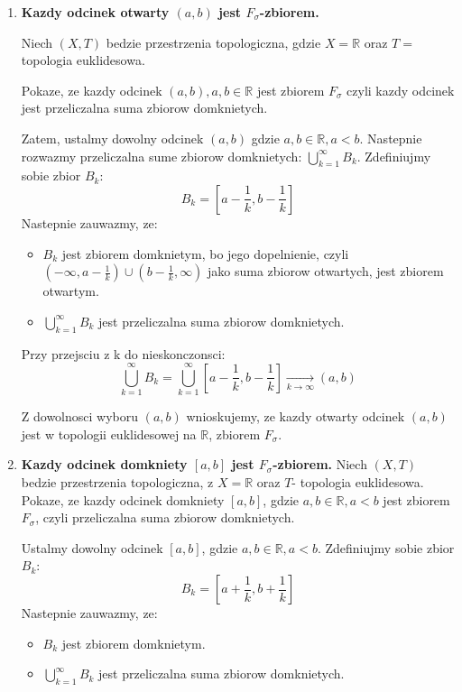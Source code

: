 \documentclass{article}
\begin{document}
\begin{enumerate}[align=left]
\begin{enumerate}[label=(\alph*)]
\begin{enumerate}[label=(\roman*)]
                
               \item \textbf{Kazdy odcinek otwarty $(a,b)$ jest $F_{\sigma}$-zbiorem.}

                    Niech $(X, T)$ bedzie przestrzenia topologiczna, gdzie $X = \mathbb{R}$ oraz $T =$ topologia euklidesowa. 

                    Pokaze, ze kazdy odcinek $(a,b), a,b \in \mathbb{R}$ jest zbiorem $F_{\sigma}$ czyli kazdy odcinek jest przeliczalna suma zbiorow domknietych.

                    Zatem, ustalmy dowolny odcinek $(a, b)$ gdzie $a,b \in \mathbb{R}, a < b$. Nastepnie rozwazmy przeliczalna sume zbiorow domknietych: $\bigcup\limits_{k = 1}^{\infty}B_{k}$. Zdefiniujmy sobie zbior $B_{k}$:
                    $$B_{k} = [a - \frac{1}{k}, b - \frac{1}{k}]$$
             Nastepnie zauwazmy, ze:
                    \begin{itemize}
                        \item $B_{k}$ jest zbiorem domknietym, bo jego dopelnienie, czyli $(-\infty, a - \frac{1}{k}) \cup (b - \frac{1}{k}, \infty)$ jako suma zbiorow otwartych, jest zbiorem otwartym.
                        \item $\bigcup\limits_{k=1}^{\infty}B_{k}$ jest przeliczalna suma zbiorow domknietych.
                    \end{itemize}
            
           Przy przejsciu z k do nieskonczonsci:
                    $$\bigcup\limits_{k=1}^{\infty}B_{k} = \bigcup\limits_{k=1}^{\infty}[a - \frac{1}{k}, b - \frac{1}{k}] \xrightarrow[k \rightarrow \infty]{}(a,b)$$
            
                    Z dowolnosci wyboru $(a,b)$ wnioskujemy, ze kazdy otwarty odcinek $(a,b)$ jest w topologii euklidesowej na $\mathbb{R}$, zbiorem $F_{\sigma}$.
                
                \item \textbf{Kazdy odcinek domkniety $[a,b]$ jest $F_{\sigma}$-zbiorem.}
                    Niech $(X,T)$ bedzie przestrzenia topologiczna, z $X = \mathbb{R}$ oraz $T$- topologia euklidesowa. Pokaze, ze kazdy odcinek domkniety $[a,b]$, gdzie $a,b \in \mathbb{R}, a < b$ jest zbiorem $F_{\sigma}$, czyli przeliczalna suma zbiorow domknietych. 

                    Ustalmy dowolny odcinek $[a,b]$, gdzie $a,b \in \mathbb{R}, a < b$. Zdefiniujmy sobie zbior $B_{k}$:
                    $$B_{k} = [a + \frac{1}{k}, b + \frac{1}{k}]$$
                    Nastepnie zauwazmy, ze:
                    \begin{itemize}
                        \item $B_{k}$ jest zbiorem domknietym.
                        \item $\bigcup\limits_{k=1}^{\infty}B_{k}$ jest przeliczalna suma zbiorow domknietych.
                        

\end{itemize}
\end{enumerate}
\end{enumerate}
\end{enumerate}
\end{document}
